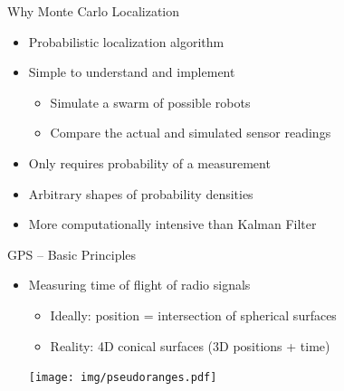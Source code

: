 \documentclass[utf8,12pt]{beamer}
\begin{document}
\begin{frame}{Why Monte Carlo Localization}
    \begin{itemize}
        \item Probabilistic localization algorithm
        \item Simple to understand and implement
        \begin{itemize}
            \item Simulate a swarm of possible robots
            \item Compare the actual and simulated sensor readings
        \end{itemize}
        \item Only requires probability of a measurement
        \item Arbitrary shapes of probability densities
    \end{itemize}
    \vspace{0.5cm}
    \begin{itemize}
        \item More computationally intensive than Kalman Filter
    \end{itemize}
\end{frame}

{
\begin{frame}{GPS -- Basic Principles}
    \begin{itemize}
        \item Measuring time of flight of radio signals
        \begin{itemize}
            \item Ideally: position = intersection of spherical surfaces
            \item Reality: 4D conical surfaces (3D positions + time)
        \end{itemize}
    \vspace{0.5cm}
    \centerline{\texttt{[image: img/pseudoranges.pdf]}}
    \end{itemize}
\end{frame}
}
\end{document}
